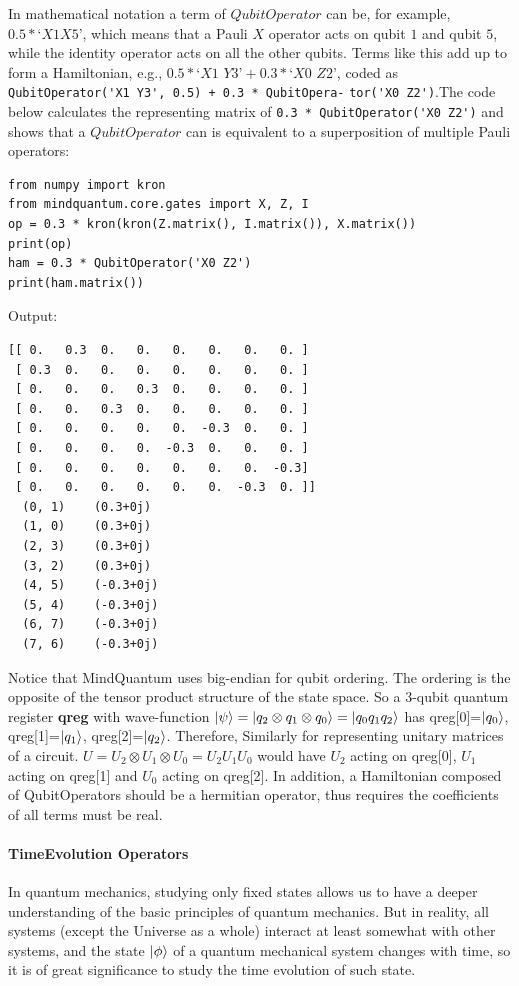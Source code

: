 In mathematical notation a term of $QubitOperator$ can be, for example, $0.5 * ‘X1 X5’$, which means that a Pauli $X$ operator acts on qubit $1$ and qubit $5$, while the identity operator acts on all the other qubits. Terms like this add up to form a Hamiltonian, e.g., $0.5 * ‘X1$ $Y3’ + 0.3 * ‘X0$ $Z2’$, coded as \verb|QubitOperator('X1 Y3', 0.5) + 0.3 * QubitOpera-| \verb|tor('X0 Z2')|.The code below calculates the representing matrix of \verb|0.3 * QubitOperator('X0 Z2')| and shows that a $QubitOperator$ can is equivalent to a superposition of multiple Pauli operators: 
\begin{lstlisting}
from numpy import kron
from mindquantum.core.gates import X, Z, I
op = 0.3 * kron(kron(Z.matrix(), I.matrix()), X.matrix())
print(op)
ham = 0.3 * QubitOperator('X0 Z2')
print(ham.matrix())
\end{lstlisting}
Output: 
\begin{lstlisting}
[[ 0.   0.3  0.   0.   0.   0.   0.   0. ]
 [ 0.3  0.   0.   0.   0.   0.   0.   0. ]
 [ 0.   0.   0.   0.3  0.   0.   0.   0. ]
 [ 0.   0.   0.3  0.   0.   0.   0.   0. ]
 [ 0.   0.   0.   0.   0.  -0.3  0.   0. ]
 [ 0.   0.   0.   0.  -0.3  0.   0.   0. ]
 [ 0.   0.   0.   0.   0.   0.   0.  -0.3]
 [ 0.   0.   0.   0.   0.   0.  -0.3  0. ]]
  (0, 1)	(0.3+0j)
  (1, 0)	(0.3+0j)
  (2, 3)	(0.3+0j)
  (3, 2)	(0.3+0j)
  (4, 5)	(-0.3+0j)
  (5, 4)	(-0.3+0j)
  (6, 7)	(-0.3+0j)
  (7, 6)	(-0.3+0j)
\end{lstlisting}
Notice that MindQuantum uses big-endian for qubit ordering. The ordering is the opposite of the tensor product structure of the state space. So a 3-qubit quantum register \textbf{qreg} with wave-function $\ket{\psi}=\ket{q_2\otimes q_1 \otimes q_0}=\ket{q_0 q_1 q_2}$  has qreg[0]=$\ket{q_0}$, qreg[1]=$\ket{q_1}$, qreg[2]=$\ket{q_2}$. Therefore, Similarly for representing unitary matrices of a circuit. $U=U_2 \otimes{U_1}\otimes{U_0}=U_2 U_1 U_0$ would have $U_2$ acting on qreg[0], $U_1$ acting on qreg[1] and $U_0$ acting on qreg[2]. In addition, a Hamiltonian composed of QubitOperators should be a hermitian operator, thus requires the coefficients of all terms must be real. 

\paragraph{TimeEvolution Operators}
In quantum mechanics, studying only fixed states allows us to have a deeper understanding of the basic principles of quantum mechanics. But in reality, all systems (except the Universe as a whole) interact at least somewhat with other systems, and the state $\ket{\phi}$ of a quantum mechanical system changes with time, so it is of great significance to study the time evolution of such state. 


